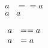 \documentclass[UTF8,9pt]{ctexart}
\begin{document}
$$
\begin{aligned}
a&==a\\
a&a\\
\end{aligned}$$
$$\begin{array}{rl}
  a&==a\\
  a&= a\\
  \end{array}
$$
\end{document}
